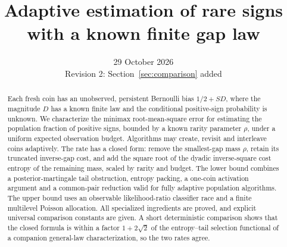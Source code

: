 \documentclass[11pt,a4paper]{article}
\title{\bfseries Adaptive estimation of rare signs\\with a known finite gap law}
\author{}
\date{29 October 2026\\[0.2em]\small Revision 2: Section~\ref{sec:comparison} added}
\theoremstyle{remark}
\newcommand{\1}{\mathbf 1}
\begin{document}
\maketitle
\begin{abstract}
Each fresh coin has an unobserved, persistent Bernoulli bias
$1/2+SD$, where the magnitude $D$ has a known finite law and the
conditional positive-sign probability is unknown. We characterize the
minimax root-mean-square error for estimating the population fraction
of positive signs, bounded by a known rarity parameter $\rho$, under a
uniform expected observation budget. Algorithms may create, revisit
and interleave coins adaptively. The rate has a closed form: remove
the smallest-gap mass $\rho$, retain its truncated inverse-gap cost,
and add the square root of the dyadic inverse-square cost entropy
of the remaining mass, scaled by rarity and budget. The lower bound
combines a posterior-martingale tail obstruction, entropy packing,
a one-coin activation argument and a common-pair reduction valid for
fully adaptive population algorithms. The upper bound uses an
observable likelihood-ratio classifier race and a finite multilevel
Poisson allocation. All specialized ingredients are proved, and
explicit universal comparison constants are given. A short
deterministic comparison shows that the closed formula is within a
factor $1+2\sqrt2$ of the entropy--tail selection functional of a
companion general-law characterization, so the two rates agree.
\end{abstract}







\clearpage
\appendix




\end{document}

